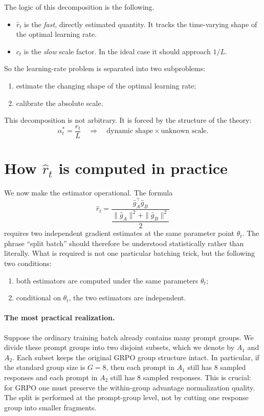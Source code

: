 \documentclass[11pt]{article}
\begin{document}
The logic of this decomposition is the following.
\begin{itemize}
    \item $\hat r_t$ is the \emph{fast}, directly estimated quantity. It tracks the time-varying shape of the optimal learning rate.
    \item $c_t$ is the \emph{slow} scale factor. In the ideal case it should approach $1/L$.
\end{itemize}

So the learning-rate problem is separated into two subproblems:
\begin{enumerate}
    \item estimate the changing shape of the optimal learning rate;
    \item calibrate the absolute scale.
\end{enumerate}

This decomposition is not arbitrary. It is forced by the structure of the theory:
\[
\alpha_t^* = \frac{r_t}{L}
\quad\Longrightarrow\quad
\text{dynamic shape} \times \text{unknown scale}.
\]


\section{How $\hat r_t$ is computed in practice}

We now make the estimator operational. The formula
\[
\hat r_t
=
\frac{\hat g_A^\top \hat g_B}{\dfrac{\|\hat g_A\|^2 + \|\hat g_B\|^2}{2}}
\]
requires two independent gradient estimates at the same parameter point $\theta_t$. The phrase ``split batch'' should therefore be understood statistically rather than literally. What is required is not one particular batching trick, but the following two conditions:
\begin{enumerate}
    \item both estimators are computed under the same parameters $\theta_t$;
    \item conditional on $\theta_t$, the two estimators are independent.
\end{enumerate}

\paragraph{The most practical realization.}
Suppose the ordinary training batch already contains many prompt groups. We divide these prompt groups into two disjoint subsets, which we denote by $A_1$ and $A_2$. Each subset keeps the original GRPO group structure intact. In particular, if the standard group size is $G=8$, then each prompt in $A_1$ still has $8$ sampled responses and each prompt in $A_2$ still has $8$ sampled responses. This is crucial: for GRPO one must preserve the within-group advantage normalization quality. The split is performed at the prompt-group level, not by cutting one response group into smaller fragments.
\end{document}
